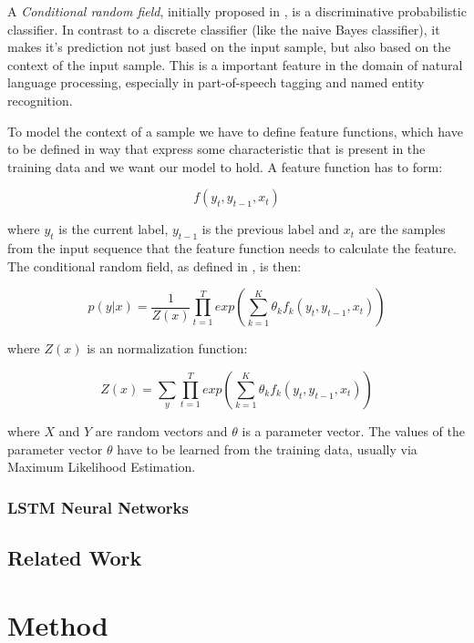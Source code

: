 \documentclass[12pt]{book}
\begin{document}
	A \textit{Conditional random field}, initially proposed in \cite{lafferty2001conditional}, is a discriminative probabilistic classifier. In contrast to a discrete classifier (like the naive Bayes classifier), it makes it's prediction not just based on the input sample, but also based on the context of the input sample. This is a important feature in the domain of natural language processing, especially in part-of-speech tagging and named entity recognition. 
	
	To model the context of a sample we have to define feature functions, which have to be defined in way that express some characteristic that is present in the training data and we want our model to hold. A feature function has to form:
	
	\begin{equation}
	f(y_t, y_{t-1}, x_t)
	\end{equation}
	
	where $y_t$ is the current label, $y_{t-1}$ is the previous label and $x_t$ are the samples from the input sequence that the feature function needs to calculate the feature. The conditional random field, as defined in \cite{MAL-013}, is then:
	
	\begin{equation}
	p(y|x) = \frac{1}{Z(x)} \prod_{t=1}^T exp(\sum_{k=1}^{K} \theta_k f_k(y_t, y_{t-1}, x_t))
	\end{equation}
	
	where $Z(x)$ is an normalization function:
	
	\begin{equation}
	Z(x) = \sum_{y} \prod_{t=1}^{T} exp(\sum_{k=1}^{K} \theta_k f_k(y_t, y_{t-1}, x_t))
	\end{equation}
	
	where $X$ and $Y$ are random vectors and $\theta$ is a parameter vector. The values of the parameter vector $\theta$ have to be learned from the training data, usually via Maximum Likelihood Estimation.
	
	\subsection{LSTM Neural Networks}
	
	\section{Related Work}

	\chapter{Method}
	
\end{document}
